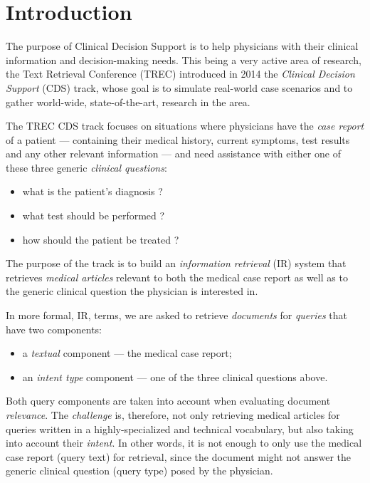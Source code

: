 \chapter{Introduction}
The purpose of Clinical Decision Support is to help physicians with their clinical information and decision-making needs.
This being a very active area of research, the Text Retrieval Conference (TREC)
introduced in 2014 the \emph{Clinical Decision Support} (CDS) track,
whose goal is to simulate real-world case scenarios and to gather world-wide, state-of-the-art, research in the area.

The TREC CDS track focuses on situations where physicians have the \emph{case report} of a patient 
--- containing their medical history, current symptoms, test results and any other relevant information --- 
and need assistance with either one of these three generic
\emph{clinical questions}: 
\begin{itemize}[noitemsep,nolistsep]
 \item what is the patient's diagnosis ?
 \item what test should be performed ?
 \item how should the patient be treated ?\end{itemize}

The purpose of the track is to build an \emph{information retrieval} (IR) system that
retrieves \emph{medical articles} relevant to both the medical
case report as well as to the generic clinical question the physician is interested in.

In more formal, IR, terms, we are asked to retrieve \emph{documents} for \emph{queries} that have two components:
\begin{itemize}[noitemsep, nolistsep]
 \item a \emph{textual} component --- the medical case report;
 \item an \emph{intent type} component --- one of the three clinical questions above.
\end{itemize}

Both query components are taken into account when evaluating document \emph{relevance}.
The \emph{challenge} is, therefore, not only retrieving medical articles for queries written in a highly-specialized and technical
vocabulary, but also taking into account their \emph{intent}.
In other words, it 
is not enough to only use the medical case report (query text)
for retrieval, since the document might not answer the generic clinical question (query type) posed by the physician.


